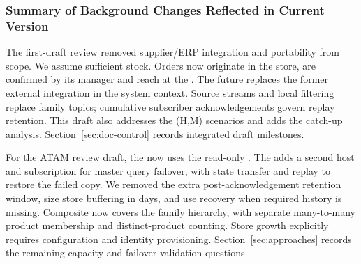 \subsubsection{Summary of Background Changes Reflected in Current Version}
\label{sec:background-changes}
The first-draft review removed supplier/ERP integration and portability from scope.
We assume sufficient \DC stock. Orders now originate in the store, are confirmed by
its manager and reach \ShippingOrderFulfillment at the \DC. The future
\AnalyticsClient replaces the former external integration in the system context.
Source streams and local filtering replace family topics; cumulative subscriber
acknowledgements govern replay retention. This draft also addresses the (H,M)
scenarios and adds the  catch-up analysis.
Section~\ref{sec:doc-control} records integrated draft milestones.

For the ATAM review draft, the \AnalyticsClient now uses the read-only \InventoryQuery.
The \StandbyMaster adds a second \DC host and subscription for master query failover,
with state transfer and replay to restore the failed copy.
We removed the extra post-acknowledgement retention window, size store buffering in
days, and use \StoreSnapshot recovery when required history is missing. Composite
now covers the family hierarchy, with separate many-to-many product membership and
distinct-product counting. Store growth explicitly requires configuration and identity
provisioning. Section~\ref{sec:approaches} records the remaining capacity and failover
validation questions.
